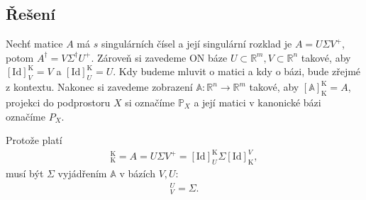 \documentclass[]{article}
\newcommand{\Id}[2]{\ensuremath{[\mathrm{Id}]_{#1}^{#2}}}
\begin{document}
\subsection{Řešení}
Nechť matice $A$ má $s$ singulárních čísel a její singulární rozklad je $A = U \Sigma V^+$, potom $A^\dagger = V \Sigma^\dagger U^+$. Zároveň si zavedeme ON báze $U \subset \mathbb{R}^m, V \subset \mathbb{R}^n$ takové, aby $\Id{V}{\mathrm{K}} = V$ a $\Id{U}{\mathrm{K}} = U$. Kdy budeme mluvit o matici a kdy o bázi, bude zřejmé z kontextu. Nakonec si zavedeme zobrazení $\mathbb{A}: \mathbb{R}^n \rightarrow \mathbb{R}^m$ takové, aby $[\mathbb{A}]_\mathrm{K}^\mathrm{K} = A$, projekci do podprostoru $X$ si označíme $\mathbb{P}_X$ a její matici v kanonické bázi označíme $P_X$.

\medskip

Protože platí
\begin{align*}
  [\mathbb{A}]_\mathrm{K}^\mathrm{K} = A = U \Sigma V^+ = \Id{U}{\mathrm{K}} \Sigma \Id{\mathrm{K}}{V},
\end{align*}
musí být $\Sigma$ vyjádřením $\mathbb{A}$ v bázích $V, U$:
\begin{align*}
  [\mathbb{A}]_V^U = \Sigma.
\end{align*}
\end{document}
